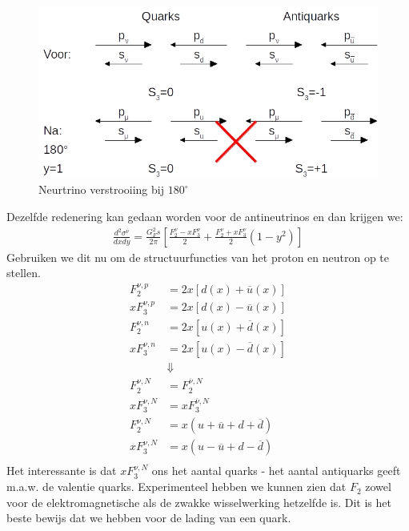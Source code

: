 \documentclass[../main.tex]{subfiles}
\begin{document}
\begin{figure}[h]
    \centering
    \includegraphics[width=0.8\linewidth]{DIS_nucleon_structuur_pdf/neutr_scat_f_3.jpg}
    \caption{Neurtrino verstrooiing bij $180^\circ$}%
    \label{fig:neutr_scat_f_3}
\end{figure}

Dezelfde redenering kan gedaan worden voor de antineutrinos en dan krijgen we:
\begin{equation}
    \begin{aligned}
        \label{eq:struct_func_nucleon_zwak_anti}
        \frac{d^2 \sigma^{\overline \nu}}{dxdy} = \frac{G_F^2 s}{2\pi} \left[ \frac{F_2^\nu-xF_3^\nu}{2} + \frac{F_2^\nu+xF_3^\nu}{2}(1-y^2) \right]
    \end{aligned}
\end{equation}
Gebruiken we dit nu om de structuurfuncties van het proton en neutron op te stellen.
\begin{equation}
    \begin{aligned}
        \label{eq:struct_func_neutrino_proton_neutron}
        F_2^{\nu, p} &= 2x[d(x)+\overline u(x)]\\
        xF_3^{\nu, p} &= 2x[d(x)-\overline u(x)]\\
        F_2^{\nu, n} &= 2x[u(x)+\overline d(x)]\\
        xF_3^{\nu, n} &= 2x[u(x)-\overline d(x)]\\
                      &\Downarrow\\
        F_2^{\nu, N} &= F_2^{\overline \nu, N}\\
        xF_3^{\nu, N} &= xF_3^{\overline \nu, N}\\
        F_2^{\nu, N} &= x(u+\overline u+d+\overline d)\\
        xF_3^{\nu, N} &= x(u-\overline u+d-\overline d)\\
    \end{aligned}
\end{equation}
Het interessante is dat $xF_3^{\nu, N}$ ons het aantal quarks - het aantal antiquarks geeft m.a.w. de valentie quarks. Experimenteel hebben we kunnen zien dat $F_2$ zowel voor de elektromagnetische als de zwakke wisselwerking hetzelfde is. Dit is het beste bewijs dat we hebben voor de lading van een quark.
\end{document}
